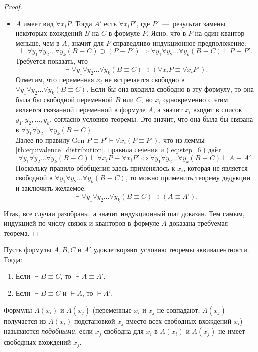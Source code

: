 \begin{proof}
\begin{itemize}
        \item \underline{$A$ имеет вид $\forall x_iP$}. Тогда $A'$ есть $\forall x_iP'$, где $P'$~---~результат замены некоторых вхождений $B$ на $C$ в формуле $P$. Ясно, что в $P$ на один квантор меньше, чем в $A$, значит для $P$ справедливо индукционное предположение:
        \begin{equation}\label{eq:step_6}
            \vdash \forall y_1\forall y_2\dots\forall y_k(B \equiv C) \supset (P \equiv P') \Longrightarrow \forall y_1\forall y_2\dots\forall y_k(B \equiv C) \vdash P \equiv P'.
        \end{equation}
        Требуется показать, что
        \[
            \vdash \forall y_1\forall y_2\dots\forall y_k(B \equiv C) \supset (\forall x_iP \equiv \forall x_iP').
        \]
        Отметим, что переменная $x_i$ не встречается свободно в $\forall y_1\forall y_2\dots\forall y_k(B \equiv C)$. Если бы она входила свободно в эту формулу, то она была бы свободной переменной $B$ или $C$, но $x_i$ одновременно с этим является связанной переменной в формуле $A$, а значит $x_i$ входит в список $y_1, y_2, \dots, y_k$, согласно условию теоремы. Это значит, что она была бы связана в $\forall y_1\forall y_2\dots\forall y_k(B \equiv C)$. \\
        Далее по правилу Gen $P \equiv P' \vdash \forall x_i(P \equiv P')$, что из леммы \ref{th:equivalence_distribution}, правила сечения и (\ref{eq:step_6}) даёт
        \[
            \forall y_1\forall y_2\dots\forall y_k(B \equiv C) \vdash \forall x_iP \equiv \forall x_iP' \Longleftrightarrow \forall y_1\forall y_2\dots\forall y_k(B \equiv C) \vdash A \equiv A'.
        \]
        Поскольку правило обобщения здесь применялось к $x_i$, которая не является свободной в $\forall y_1\forall y_2\dots\forall y_k(B \equiv C)$, то можно применить теорему дедукции и заключить желаемое:
        \[
            \vdash \forall y_1\forall y_2\dots\forall y_k(B \equiv C) \supset (A \equiv A').
        \]
    \end{itemize}
    Итак, все случаи разобраны, а значит индукционный шаг доказан. Тем самым, индукцией по числу связок и кванторов в формуле $A$ доказана требуемая теорема.
\end{proof}
\begin{corollary}
    Пусть формулы $A, B, C$ и $A'$ удовлетворяют условию теоремы эквивалентности. Тогда:
    \begin{enumerate}
        \item Если $\vdash B \equiv C$, то $\vdash A \equiv A'$.
        \item Если $\vdash B \equiv C$ и $\vdash A$, то $\vdash A'$.
    \end{enumerate}
\end{corollary}
\begin{definition*}
    Формулы $A(x_i)$ и $A(x_j)$ (переменные $x_i$ и $x_j$ не совпадают, $A(x_j)$ получается из $A(x_i)$ подстановкой $x_j$ вместо всех свободных вхождений $x_i$) называются \textit{подобными}, если $x_j$ свободна для $x_i$ в $A(x_i)$ и $A(x_j)$ не имеет свободных вхождений $x_j$.
\end{definition*}

